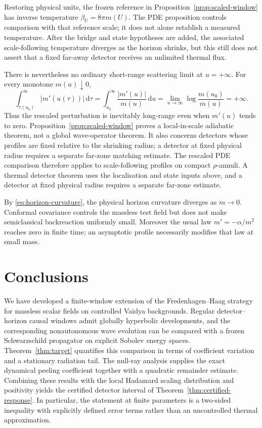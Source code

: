 \documentclass[11pt,a4paper]{article}
\theoremstyle{definition}
\theoremstyle{remark}
\newcommand{\dd}{\mathrm d}
\begin{document}
	Restoring physical units, the frozen reference in
	Proposition~\ref{prop:scaled-window} has inverse temperature
	$\beta_U=8\pi m(U)$.  The PDE proposition controls comparison with that
	reference scale; it does not alone establish a measured temperature.  After
	the bridge and state hypotheses are added, the associated scale-following
	temperature diverges as the horizon shrinks, but this still does not assert
	that a fixed far-away detector receives an unlimited thermal flux.
	
	There is nevertheless no ordinary short-range scattering limit at
	$u=+\infty$.  For every monotone $m(u)\downarrow0$,
	\begin{equation}
		\int_{\tau(u_0)}^{\infty}|m'(u(\tau))|\,\dd\tau
		=\int_{u_0}^{\infty}\frac{|m'(u)|}{m(u)}\,\dd u
		=\lim_{u\to\infty}\log\frac{m(u_0)}{m(u)}=+\infty.
		\label{eq:long-range-obstruction}
	\end{equation}
	Thus the rescaled perturbation is inevitably long-range even when $m'(u)$
	tends to zero.  Proposition~\ref{prop:scaled-window} proves a local-in-scale
	adiabatic theorem, not a global wave-operator theorem.  It also concerns
	detectors whose profiles are fixed relative to the shrinking radius; a
	detector at fixed physical radius requires a separate far-zone matching
	estimate.  The rescaled PDE comparison therefore applies to scale-following
	profiles on compact $\rho$-annuli.  A thermal detector theorem
	uses the localisation and state inputs above, and a detector at fixed
	physical radius requires a separate far-zone estimate.
	
	By \eqref{eq:horizon-curvature}, the physical
	horizon curvature diverges as $m\to0$.  Conformal covariance controls the
	massless test field but does not make semiclassical backreaction uniformly
	small.  Moreover the usual law $m'=-\alpha/m^2$ reaches zero in finite time;
	an asymptotic profile necessarily modifies that law at small mass.
	
	\section{Conclusions}
	
	We have developed a finite-window extension of the
	Fredenhagen--Haag strategy for massless scalar fields on controlled Vaidya
	backgrounds.  Regular detector--horizon causal windows admit globally
	hyperbolic developments, and the corresponding nonautonomous wave evolution
	can be compared with a frozen Schwarzschild propagator on explicit Sobolev
	energy spaces.  Theorem~\ref{thm:target} quantifies this comparison in terms
	of coefficient variation and a stationary radiation tail.  The null-ray
	analysis supplies the exact dynamical peeling coefficient together with a
	quadratic remainder estimate.  Combining these results with the local
	Hadamard scaling distribution and positivity yields the certified detector
	interval of Theorem~\ref{thm:certified-response}.  In particular, the
	statement at finite parameters is a two-sided inequality with explicitly
	defined error terms rather than an uncontrolled thermal approximation.
	
\end{document}
